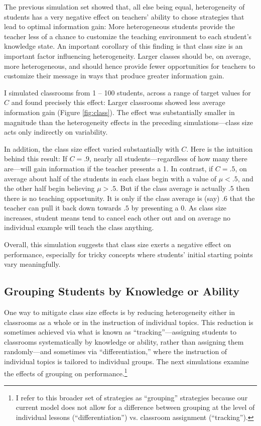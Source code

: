 \documentclass[10pt,letterpaper]{article}
\begin{document}
The previous simulation set showed that, all else being equal, heterogeneity of students has a very negative effect on teachers' ability to chose strategies that lead to optimal information gain: More heterogeneous students provide the teacher less of a chance to customize the teaching environment to each student's knowledge state. An important corollary of this finding is that class size is an important factor influencing heterogeneity. Larger classes should be, on average, more heterogeneous, and should hence provide fewer opportunities for teachers to customize their message in ways that produce greater information gain.

I simulated classrooms from 1 -- 100 students, across a range of target values for $C$ and found precisely this effect: Larger classrooms showed less average information gain (Figure \ref{fig:class}). The  effect was substantially smaller in magnitude than the heterogeneity effects in the preceding simulations---class size acts only indirectly on variability. 

In addition, the class size effect varied substantially with $C$. Here is the intuition behind this result: If $C=.9$, nearly all students---regardless of how many there are---will gain information if the teacher presents a 1. In contrast, if $C=.5$, on average about half of the students in each class begin with a value of $\mu < .5$, and the other half begin believing $\mu > .5$. But if the class average is actually $.5$ then there is no teaching opportunity. It is only if the class average is (say) $.6$ that the teacher can pull it back down towards $.5$ by presenting a 0. As class size increases, student means tend to cancel each other out and  on average no individual example will teach the class anything. 

Overall, this simulation suggests that class size exerts a negative effect on performance, especially for tricky concepts where students' initial starting points vary meaningfully. 

\subsection{Grouping Students by Knowledge or Ability}



One way to mitigate class size effects is by reducing heterogeneity either in classrooms as a whole or in the instruction of individual topics. This reduction is sometimes achieved via what is known as ``tracking''---assigning students to classrooms systematically by knowledge or ability, rather than assigning them randomly---and sometimes via ``differentiation,'' where the instruction of individual topics is tailored to individual groups. The next simulations examine the effects of grouping on performance.\footnote{I refer to this broader set of strategies as ``grouping'' strategies because our current model does not allow for a difference between grouping at the level of individual lessons (``differentiation'') vs. classroom assignment (``tracking'').} 
\end{document}

